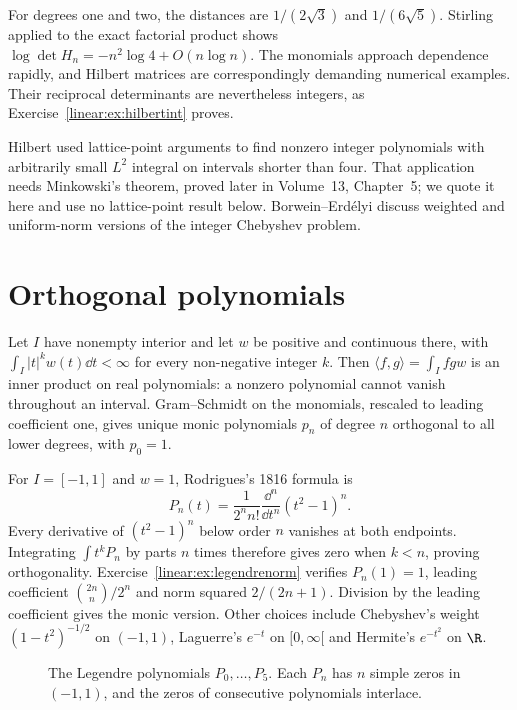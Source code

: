 For degrees one and two, the distances are $1/(2\sqrt3)$ and $1/(6\sqrt5)$. Stirling applied to the exact factorial product shows $\log\det H_n=-n^2\log4+O(n\log n)$. The monomials approach dependence rapidly, and Hilbert matrices are correspondingly demanding numerical examples. Their reciprocal determinants are nevertheless integers, as Exercise~\ref{linear:ex:hilbertint} proves.

\begin{remark}
Hilbert used lattice-point arguments to find nonzero integer polynomials with arbitrarily small $L^2$ integral on intervals shorter than four. That application needs Minkowski's theorem, proved later in Volume~13, Chapter~5; we quote it here and use no lattice-point result below. Borwein--Erd\'elyi discuss weighted and uniform-norm versions of the integer Chebyshev problem.
\end{remark}

\section{Orthogonal polynomials}

Let $I$ have nonempty interior and let $w$ be positive and continuous there, with $\int_I|t|^kw(t)\dd t<\infty$ for every non-negative integer $k$. Then $\langle f,g\rangle=\int_Ifgw$ is an inner product on real polynomials: a nonzero polynomial cannot vanish throughout an interval. Gram--Schmidt on the monomials, rescaled to leading coefficient one, gives unique monic polynomials $p_n$ of degree $n$ orthogonal to all lower degrees, with $p_0=1$.

\begin{example}\label{linear:exa:legendre}
For $I=[-1,1]$ and $w=1$, Rodrigues's 1816 formula is
\[P_n(t)=\frac1{2^nn!}\frac{\dd^n}{\dd t^n}(t^2-1)^n.
\]
Every derivative of $(t^2-1)^n$ below order $n$ vanishes at both endpoints. Integrating $\int t^kP_n$ by parts $n$ times therefore gives zero when $k<n$, proving orthogonality. Exercise~\ref{linear:ex:legendrenorm} verifies $P_n(1)=1$, leading coefficient $\binom{2n}n/2^n$ and norm squared $2/(2n+1)$. Division by the leading coefficient gives the monic version. Other choices include Chebyshev's weight $(1-t^2)^{-1/2}$ on $(-1,1)$, Laguerre's $e^{-t}$ on $[0,\infty[$ and Hermite's $e^{-t^2}$ on $\R$.
\end{example}
\begin{figure}[ht]
\centering
{}
\caption{The Legendre polynomials $P_0,\dots,P_5$. Each $P_n$ has $n$ simple zeros in $(-1,1)$, and the zeros of
consecutive polynomials interlace.}
\label{linear:fig:legendre}
\end{figure}

